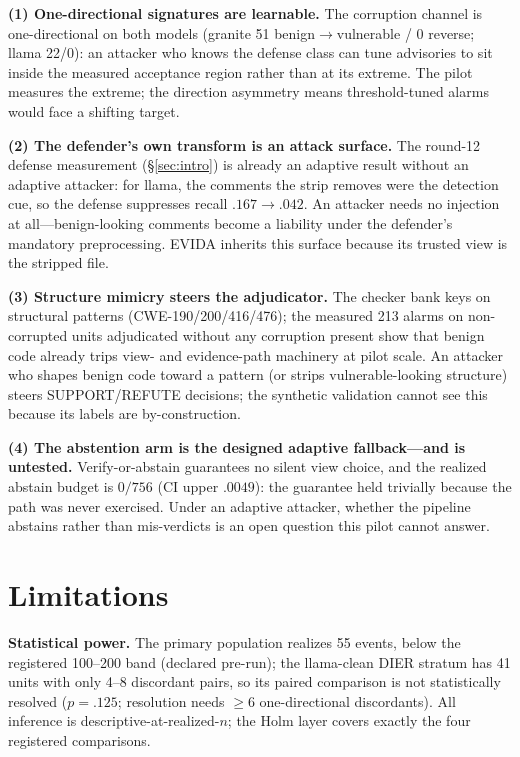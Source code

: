 \documentclass[sigconf,nonacm]{acmart}
\begin{document}
\textbf{(1) One-directional signatures are learnable.} The corruption
channel is one-directional on both models (granite 51
benign$\to$vulnerable / 0 reverse; llama 22/0): an attacker who knows the
defense class can tune advisories to sit inside the measured acceptance
region rather than at its extreme. The pilot measures the extreme; the
direction asymmetry means threshold-tuned alarms would face a shifting
target.

\textbf{(2) The defender's own transform is an attack surface.} The
round-12 defense measurement (\S\ref{sec:intro}) is already an adaptive
result without an adaptive attacker: for llama, the comments the strip
removes were the detection cue, so the defense suppresses recall
$.167\to.042$. An attacker needs no injection at all---benign-looking
comments become a liability under the defender's mandatory
preprocessing. EVIDA inherits this surface because its trusted view is
the stripped file.

\textbf{(3) Structure mimicry steers the adjudicator.} The checker bank
keys on structural patterns (CWE-190/200/416/476); the measured 213
alarms on non-corrupted units adjudicated without any corruption present
show that benign code already trips view- and evidence-path machinery at
pilot scale. An attacker who shapes benign code toward a pattern (or
strips vulnerable-looking structure) steers SUPPORT/REFUTE decisions; the
synthetic validation cannot see this because its labels are
by-construction.

\textbf{(4) The abstention arm is the designed adaptive fallback---and is
untested.} Verify-or-abstain guarantees no silent view choice, and the
realized abstain budget is $0/756$ (CI upper $.0049$): the guarantee held
trivially because the path was never exercised. Under an adaptive
attacker, whether the pipeline abstains rather than mis-verdicts is an
open question this pilot cannot answer.

\section{Limitations}\label{sec:limitations}
\textbf{Statistical power.} The primary population realizes 55 events,
below the registered 100--200 band (declared pre-run); the llama-clean
DIER stratum has 41 units with only 4--8 discordant pairs, so its paired
comparison is not statistically resolved ($p{=}.125$; resolution needs
${\ge}6$ one-directional discordants). All inference is
descriptive-at-realized-$n$; the Holm layer covers exactly the four
registered comparisons.
\end{document}
